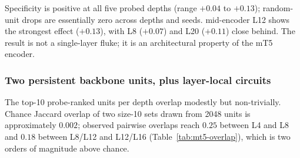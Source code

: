 \begin{table}[H]
\centering
\caption{mT5 encoder ablation across depth. Top-10 versus random-mean specificity per measure\_L. Localisation persists across encoder depth; mid-encoder (L12) is strongest.}
\label{tab:mt5-depth}
\small
{}
\end{table}

Specificity is positive at all five probed depths (range $+0.04$ to $+0.13$); random-unit drops are essentially zero across depths and seeds. mid-encoder L12 shows the strongest effect ($+0.13$), with L8 ($+0.07$) and L20 ($+0.11$) close behind. The result is not a single-layer fluke; it is an architectural property of the mT5 encoder.

\subsubsection{Two persistent backbone units, plus layer-local circuits}

The top-10 probe-ranked units per depth overlap modestly but non-trivially. Chance Jaccard overlap of two size-10 sets drawn from 2048 units is approximately $0.002$; observed pairwise overlaps reach $0.25$ between L4 and L8 and $0.18$ between L8/L12 and L12/L16 (Table~\ref{tab:mt5-overlap}), which is two orders of magnitude above chance.


